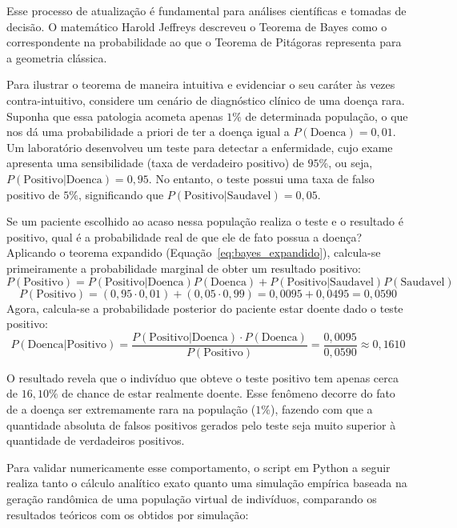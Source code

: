 Esse processo de atualização é fundamental para análises científicas e tomadas de decisão. O matemático Harold Jeffreys descreveu o Teorema de Bayes como o correspondente na probabilidade ao que o Teorema de Pitágoras representa para a geometria clássica.

Para ilustrar o teorema de maneira intuitiva e evidenciar o seu caráter às vezes contra-intuitivo, considere um cenário de diagnóstico clínico de uma doença rara. Suponha que essa patologia acometa apenas $1\%$ de determinada população, o que nos dá uma probabilidade a priori de ter a doença igual a $P(\text{Doenca}) = 0{,}01$. Um laboratório desenvolveu um teste para detectar a enfermidade, cujo exame apresenta uma sensibilidade (taxa de verdadeiro positivo) de $95\%$, ou seja, $P(\text{Positivo}|\text{Doenca}) = 0{,}95$. No entanto, o teste possui uma taxa de falso positivo de $5\%$, significando que $P(\text{Positivo}|\text{Saudavel}) = 0{,}05$. 

Se um paciente escolhido ao acaso nessa população realiza o teste e o resultado é positivo, qual é a probabilidade real de que ele de fato possua a doença? Aplicando o teorema expandido (Equação~\ref{eq:bayes_expandido}), calcula-se primeiramente a probabilidade marginal de obter um resultado positivo:
\[ P(\text{Positivo}) = P(\text{Positivo}|\text{Doenca})P(\text{Doenca}) + P(\text{Positivo}|\text{Saudavel})P(\text{Saudavel}) \]
\[ P(\text{Positivo}) = (0{,}95 \cdot 0{,}01) + (0{,}05 \cdot 0{,}99) = 0{,}0095 + 0{,}0495 = 0{,}0590 \]
Agora, calcula-se a probabilidade posterior do paciente estar doente dado o teste positivo:
\begin{equation}
    P(\text{Doenca}|\text{Positivo}) = \frac{P(\text{Positivo}|\text{Doenca}) \cdot P(\text{Doenca})}{P(\text{Positivo})} = \frac{0{,}0095}{0{,}0590} \approx 0{,}1610
    \label{eq:exemplo_bayes_calculo}
\end{equation}

O resultado revela que o indivíduo que obteve o teste positivo tem apenas cerca de $16{,}10\%$ de chance de estar realmente doente. Esse fenômeno decorre do fato de a doença ser extremamente rara na população ($1\%$), fazendo com que a quantidade absoluta de falsos positivos gerados pelo teste seja muito superior à quantidade de verdadeiros positivos.

Para validar numericamente esse comportamento, o script em Python a seguir realiza tanto o cálculo analítico exato quanto uma simulação empírica baseada na geração randômica de uma população virtual de indivíduos, comparando os resultados teóricos com os obtidos por simulação:



